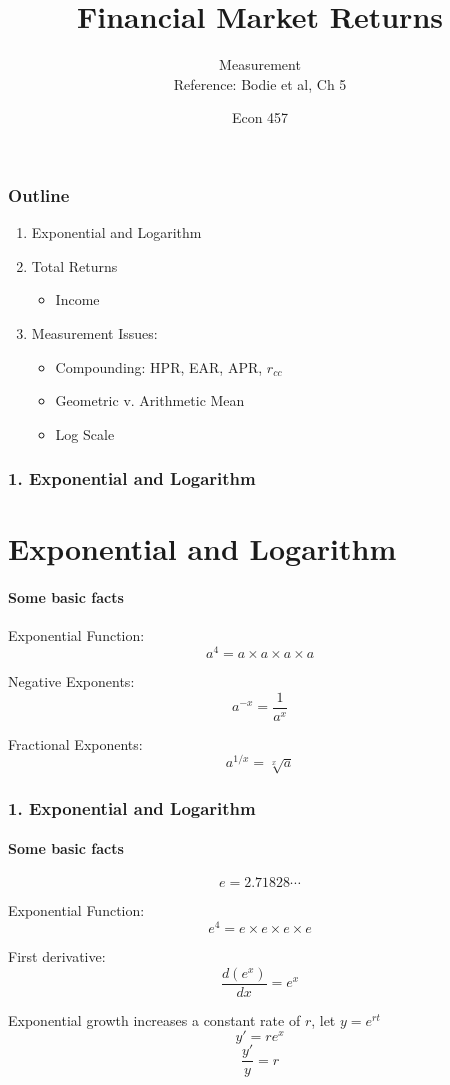 \documentclass{beamer}
\title{Financial Market Returns}
\subtitle{Measurement \\ Reference: Bodie et al, Ch 5}
\author{Econ 457}
\date{\week}
\begin{document}
\frame{\titlepage}

\begin{frame}
    \frametitle{Outline}

    \begin{enumerate}
        \item Exponential and Logarithm
        \item Total Returns
        \begin{itemize}
            \item Income
        \end{itemize}
        \item Measurement Issues: 
        \begin{itemize}
            \item Compounding: HPR, EAR, APR, $r_{cc}$
            \item Geometric v. Arithmetic Mean
            \item Log Scale
        \end{itemize}
    \end{enumerate}
\end{frame}


\begin{foundframe}[t]
    \frametitle{1. Exponential and Logarithm}
    \section{Exponential and Logarithm}
    \framesubtitle{Some basic facts}

    Exponential Function:
    $$a^4 = a \times a \times a \times a$$

    Negative Exponents:
    $$a^{-x} = \frac{1}{a^x}$$

    Fractional Exponents:
    $$a^{1/x} = \sqrt[x]{a}$$

\end{foundframe}

\begin{foundframe}[t]
    \frametitle{1. Exponential and Logarithm}
    \framesubtitle{Some basic facts}

    $$ e = 2.71828\cdots$$

    Exponential Function:
    $$e^4 = e \times e \times e \times e$$

    First derivative:
    $$\frac{d(e^x)}{dx} = e^x$$

    Exponential growth increases a constant rate of $r$, let $y = e^{rt}$
    $$y' = re^x$$
    $$\frac{y'}{y} = r$$

\end{foundframe}
\end{document}
